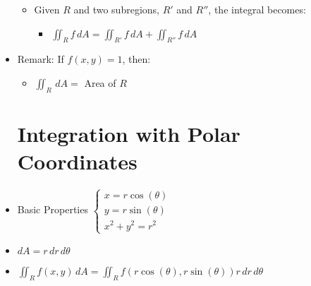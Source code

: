 \begin{itemize}
\begin{itemize}
      \item Given $R$ and two subregions, $R'$ and $R''$, the integral becomes:

        \begin{itemize}

          \item $\displaystyle \iint_R f\,dA = \iint_{R'} f\,dA + \iint_{R''} f\,dA$

        \end{itemize}

    \end{itemize}

  \item Remark: If $f(x,y)=1$, then:

    \begin{itemize}

      \item $\displaystyle \iint_R\,dA =$ Area of $R$

    \end{itemize}

    \section{Integration with Polar Coordinates}

  \item Basic Properties $\left\{\begin{array}{c} x=r\cos(\theta)\\y=r\sin(\theta)\\x^2+y^2=r^2  \end{array}$

    \item $dA = r\,dr\,d\theta$

    \item $\displaystyle \iint_R f(x,y)\,dA=\displaystyle \iint_R f(r\cos(\theta), r\sin(\theta))r\,dr\,d\theta$

\end{itemize}



